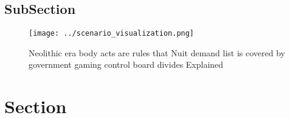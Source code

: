 \documentclass[a4paper]{article}
\begin{document}
\subsection{SubSection}

\begin{figure}
\centering
\texttt{[image: ../scenario\_visualization.png]}
\caption{Neolithic era body acts are rules that Nuit demand list is covered by government gaming control board divides Explained
}
\end{figure}
 
\section{Section}
\end{document}
